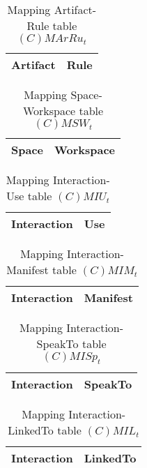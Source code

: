\begin{table}[H]
	\centering
	\begin{tabular}{|p{4cm}|p{8cm}|}
			\hline
			\textbf{Artifact} & \textbf{Rule} \\
			\hline
			\hline
		\end{tabular}
	\caption{Mapping Artifact-Rule table $(C)MArRu_t$}
	\label{tab:cmarrut}
\end{table}

\begin{table}[H]
	\centering
	\begin{tabular}{|p{4cm}|p{8cm}|}
			\hline
			\textbf{Space} & \textbf{Workspace} \\
			\hline
			\hline
		\end{tabular}
	\caption{Mapping Space-Workspace table $(C)MSW_t$}
	\label{tab:cmsrt}
\end{table}

\begin{table}[H]
	\centering
	\begin{tabular}{|p{4cm}|p{8cm}|}
			\hline
			\textbf{Interaction} & \textbf{Use} \\
			\hline
			\hline
		\end{tabular}
	\caption{Mapping Interaction-Use table $(C)MIU_t$}
	\label{tab:cmiut}
\end{table}

\begin{table}[H]
	\centering
	\begin{tabular}{|p{4cm}|p{8cm}|}
			\hline
			\textbf{Interaction} & \textbf{Manifest} \\
			\hline
			\hline
		\end{tabular}
	\caption{Mapping Interaction-Manifest table $(C)MIM_t$}
	\label{tab:cmimt}
\end{table}

\begin{table}[H]
	\centering
	\begin{tabular}{|p{4cm}|p{8cm}|}
			\hline
			\textbf{Interaction} & \textbf{SpeakTo} \\
			\hline
			\hline
		\end{tabular}
	\caption{Mapping Interaction-SpeakTo table $(C)MISp_t$}
	\label{tab:cmispt}
\end{table}

\begin{table}[H]
	\centering
	\begin{tabular}{|p{4cm}|p{8cm}|}
			\hline
			\textbf{Interaction} & \textbf{LinkedTo} \\
			\hline
			\hline
		\end{tabular}
	\caption{Mapping Interaction-LinkedTo table $(C)MIL_t$}
	\label{tab:cmilt}
\end{table}

